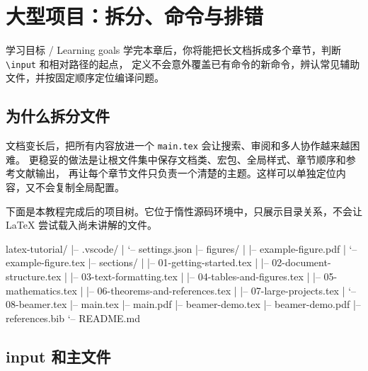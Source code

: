 %
\section{大型项目：拆分、命令与排错}

\begin{learningbox}{学习目标 / Learning goals}
学完本章后，你将能把长文档拆成多个章节，判断 \texttt{\textbackslash input} 和相对路径的起点，
定义不会意外覆盖已有命令的新命令，辨认常见辅助文件，并按固定顺序定位编译问题。
\end{learningbox}

\subsection{为什么拆分文件}

文档变长后，把所有内容放进一个 \texttt{main.tex} 会让搜索、审阅和多人协作越来越困难。
更稳妥的做法是让根文件集中保存文档类、宏包、全局样式、章节顺序和参考文献输出，
再让每个章节文件只负责一个清楚的主题。这样可以单独定位内容，又不会复制全局配置。

下面是本教程完成后的项目树。它位于惰性源码环境中，只展示目录关系，不会让 LaTeX
尝试载入尚未讲解的文件。

\begin{codeblock}
latex-tutorial/
|-- .vscode/
|   `-- settings.json
|-- figures/
|   |-- example-figure.pdf
|   `-- example-figure.tex
|-- sections/
|   |-- 01-getting-started.tex
|   |-- 02-document-structure.tex
|   |-- 03-text-formatting.tex
|   |-- 04-tables-and-figures.tex
|   |-- 05-mathematics.tex
|   |-- 06-theorems-and-references.tex
|   |-- 07-large-projects.tex
|   `-- 08-beamer.tex
|-- main.tex
|-- main.pdf
|-- beamer-demo.tex
|-- beamer-demo.pdf
|-- references.bib
`-- README.md
\end{codeblock}

\subsection{input 和主文件}

